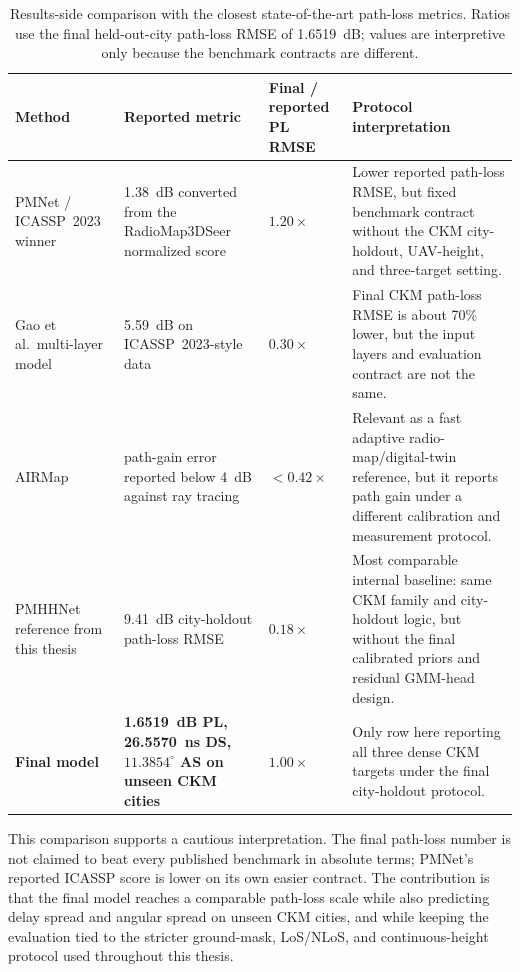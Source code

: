 \begin{table}[H]
\centering
\caption[Results-side comparison with closest state-of-the-art metrics.]%
{Results-side comparison with the closest state-of-the-art path-loss metrics.
Ratios use the final held-out-city path-loss RMSE of \SI{1.6519}{dB}; values
are interpretive only because the benchmark contracts are different.}
\label{tab:soa_result_comparison}
\scriptsize
\begin{tabularx}{\textwidth}{>{\raggedright\arraybackslash}p{}
>{\raggedright\arraybackslash}p{}
>{\centering\arraybackslash}p{}
>{\raggedright\arraybackslash}X}
\toprule
Method & Reported metric & Final / reported PL RMSE & Protocol interpretation \\
\midrule
PMNet / ICASSP~2023 winner \cite{pmnet2023,icassp2023challenge} &
\SI{1.38}{dB} converted from the RadioMap3DSeer normalized score &
\(1.20\times\) &
Lower reported path-loss RMSE, but fixed benchmark contract without the CKM
city-holdout, UAV-height, and three-target setting. \\
Gao et al.\ multi-layer model \cite{gao2026} &
\SI{5.59}{dB} on ICASSP~2023-style data &
\(0.30\times\) &
Final CKM path-loss RMSE is about 70\% lower, but the input layers and
evaluation contract are not the same. \\
AIRMap \cite{airmap2025} &
path-gain error reported below \SI{4}{dB} against ray tracing &
\(<0.42\times\) &
Relevant as a fast adaptive radio-map/digital-twin reference, but it reports
path gain under a different calibration and measurement protocol. \\
PMHHNet reference from this thesis &
\SI{9.41}{dB} city-holdout path-loss RMSE &
\(0.18\times\) &
Most comparable internal baseline: same CKM family and city-holdout logic, but
without the final calibrated priors and residual GMM-head design. \\
\textbf{Final model} &
\textbf{\SI{1.6519}{dB} PL, \SI{26.5570}{ns} DS, \(11.3854^\circ\) AS on unseen CKM cities} &
\textbf{\(1.00\times\)} &
Only row here reporting all three dense CKM targets under the final
city-holdout protocol. \\
\bottomrule
\end{tabularx}
\end{table}

This comparison supports a cautious interpretation. The final path-loss number
is not claimed to beat every published benchmark in absolute terms; PMNet's
reported ICASSP score is lower on its own easier contract. The contribution is
that the final model reaches a comparable path-loss scale while also predicting
delay spread and angular spread on unseen CKM cities, and while keeping the
evaluation tied to the stricter ground-mask, LoS/NLoS, and continuous-height
protocol used throughout this thesis.

